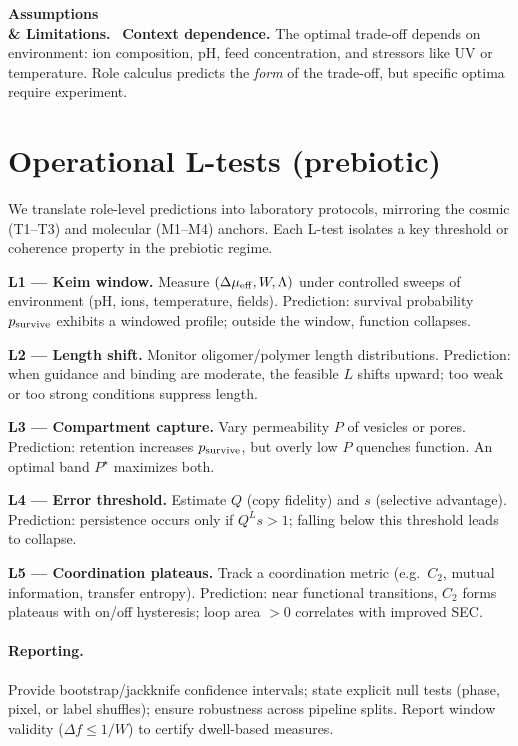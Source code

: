 \documentclass[12pt,a4paper,oneside]{scrreprt}
\newenvironment{limitation}{\par\vspace{0.5em}\noindent\textbf{Assumptions \\ \& Limitations.}\ }{\par\vspace{0.5em}}
\begin{document}
\begin{limitation}
\textbf{Context dependence.} 
The optimal trade-off depends on environment: 
ion composition, pH, feed concentration, 
and stressors like UV or temperature. 
Role calculus predicts the \emph{form} of the trade-off, 
but specific optima require experiment. 
\end{limitation}

\section{Operational L-tests (prebiotic)}\label{sec:life-tests}

We translate role-level predictions into laboratory protocols, 
mirroring the cosmic (T1--T3) and molecular (M1--M4) anchors. 
Each L-test isolates a key threshold or coherence property 
in the prebiotic regime. 

\textbf{L1 — Keim window.} 
Measure $(\Delta\mu_{\rm eff}, W, \Lambda)$ 
under controlled sweeps of environment (pH, ions, temperature, fields). 
Prediction: survival probability $p_{\rm survive}$ exhibits 
a windowed profile; outside the window, function collapses. 

\textbf{L2 — Length shift.} 
Monitor oligomer/polymer length distributions. 
Prediction: when guidance and binding are moderate, 
the feasible $L$ shifts upward; 
too weak or too strong conditions suppress length. 

\textbf{L3 — Compartment capture.} 
Vary permeability $P$ of vesicles or pores. 
Prediction: retention increases $p_{\rm survive}$, 
but overly low $P$ quenches function. 
An optimal band $P^\star$ maximizes both. 

\textbf{L4 — Error threshold.} 
Estimate $Q$ (copy fidelity) and $s$ (selective advantage). 
Prediction: persistence occurs only if $Q^L s>1$; 
falling below this threshold leads to collapse. 

\textbf{L5 — Coordination plateaus.} 
Track a coordination metric (e.g.\ $C_2$, mutual information, 
transfer entropy). 
Prediction: near functional transitions, $C_2$ forms plateaus 
with on/off hysteresis; loop area $>0$ correlates with improved SEC. 

\paragraph{Reporting.}
Provide bootstrap/jackknife confidence intervals; 
state explicit null tests (phase, pixel, or label shuffles); 
ensure robustness across pipeline splits. 
Report window validity ($\Delta f \le 1/W$) 
to certify dwell-based measures. 
\end{document}

